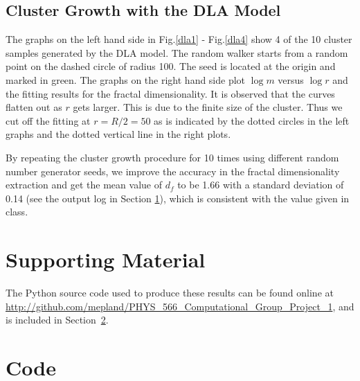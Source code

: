 \documentclass[notitlepage,aps,prd,nofootinbib]{revtex4-1}
\begin{document}
\subsection{Cluster Growth with the DLA Model}
The graphs on the left hand side in Fig.\ref{dla1} - Fig.\ref{dla4} show 4 of the 10 cluster samples generated by the DLA model. The random walker starts from a random point on the dashed circle of radius 100. The seed is located at the origin and marked in green. The graphs on the right hand side plot $\log m$ versus $\log r$ and the fitting results for the fractal dimensionality. It is observed that the curves flatten out as $r$ gets larger. This is due to the finite size of the cluster. Thus we cut off the fitting at $r = R/2 = 50$ as is indicated by the dotted circles in the left graphs and the dotted vertical line in the right plots. 

By repeating the cluster growth procedure for 10 times using different random number generator seeds, we improve the accuracy in the fractal dimensionality extraction and get the mean value of $d_f$ to be 1.66 with a standard deviation of 0.14 (see the output log in Section \ref{sec:Supporting_Material}), which is consistent with the value given in class.




\clearpage
\section{Supporting Material}
\label{sec:Supporting_Material}

 

The Python source code used to produce these results can be found online at \url{http://github.com/mepland/PHYS_566_Computational_Group_Project_1}, and is included in Section~\ref{sec:code}.
\clearpage



\clearpage
\section{Code}
\label{sec:code}





\clearpage

\end{document}
